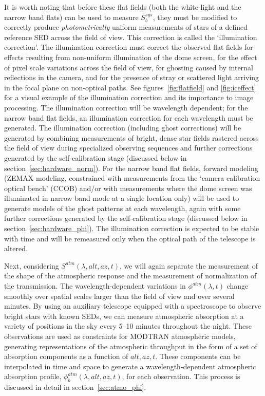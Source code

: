 \documentclass[12pt,preprint]{aastex}
\begin{document}
It is worth noting that before these flat fields (both the white-light
and the narrow band flats) can be used to measure $S_b^{sys}$, they
must be modified to correctly produce {\it photometrically} uniform
measurements of stars of a defined reference SED across the field of
view. This correction is called the `illumination correction'.  The
illumination correction must correct the observed flat fields for
effects resulting from non-uniform illumination of the dome screen,
for the effect of pixel scale variations across the field of view, for
ghosting caused by internal reflections in the camera, and for the
presence of stray or scattered light arriving in the focal plane on
non-optical paths. See figures~\ref{fig:flatfield} and
\ref{fig:iceffect} for a visual example of the illumination correction
and its importance to image processing. The illumination correction
will be wavelength dependent; for the narrow band flat fields, an
illumination correction for each wavelength must be generated.  The
illumination correction (including ghost corrections) will be
generated by combining measurements of bright, dense star fields
rastered across the field of view during specialized observing
sequences and further corrections generated by the self-calibration
stage (discussed below in section~\ref{sec:hardware_norm}). For the
narrow band flat fields, forward modeling (ZEMAX modeling, constrained
with measurements from the `camera calibration optical bench' (CCOB)
and/or with measurements where the dome screen was illuminated in
narrow band mode at a single location only) will be used to generate
models of the ghost patterns at each wavelength, again with some
further corrections generated by the self-calibration stage (discussed
below in section~\ref{sec:hardware_phi}).  The illumination correction
is expected to be stable with time and will be remeasured only when
the optical path of the telescope is altered. 

Next, considering $S^{atm}(\lambda,alt,az,t)$, we will again separate
the measurement of the shape of the atmospheric response and the
measurement of normalization of the transmission.  The
wavelength-dependent variations in $\phi^{atm}(\lambda,t)$ change
smoothly over spatial scales larger than the field of view and over
several minutes.  By using an auxiliary telescope equipped with a
spectroscope to observe bright stars with known SEDs, we can measure
atmospheric absorption at a variety of positions in the sky every
5--10 minutes throughout the night. These observations are used as
constraints for MODTRAN atmospheric models, generating representations
of the atmospheric throughput in the form of a set of absorption
components as a function of $alt,az,t$. These components can be
interpolated in time and space to generate a wavelength-dependent
atmospheric absorption profile, $\phi_b^{atm}(\lambda,alt,az,t)$, for
each observation. This process is discussed in detail in
section~\ref{sec:atmo_phi}.  
\end{document}
